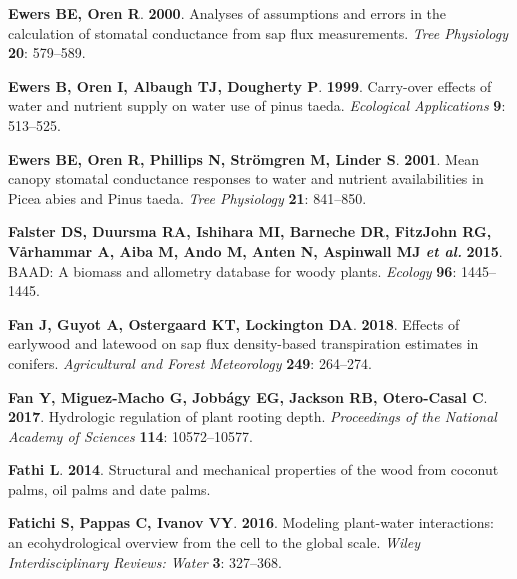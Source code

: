 \documentclass[11pt,twoside]{reedthesis}
\begin{document}
\hypertarget{ref-ewers_analyses_2000}{}
\textbf{\textnormal{Ewers BE}, \textnormal{Oren R}}. \textbf{2000}.
Analyses of assumptions and errors in the calculation of stomatal
conductance from sap flux measurements. \emph{Tree Physiology}
\textbf{20}: 579--589.

\hypertarget{ref-Ewers1999}{}
\textbf{\textnormal{Ewers B}, \textnormal{Oren I}, \textnormal{Albaugh
TJ}, \textnormal{Dougherty P}}. \textbf{1999}. Carry-over effects of
water and nutrient supply on water use of pinus taeda. \emph{Ecological
Applications} \textbf{9}: 513--525.

\hypertarget{ref-Ewers2001}{}
\textbf{\textnormal{Ewers BE}, \textnormal{Oren R}, \textnormal{Phillips
N}, \textnormal{Strömgren M}, \textnormal{Linder S}}. \textbf{2001}.
Mean canopy stomatal conductance responses to water and nutrient
availabilities in Picea abies and Pinus taeda. \emph{Tree Physiology}
\textbf{21}: 841--850.

\hypertarget{ref-Falster2015}{}
\textbf{\textnormal{Falster DS}, \textnormal{Duursma RA},
\textnormal{Ishihara MI}, \textnormal{Barneche DR}, \textnormal{FitzJohn
RG}, \textnormal{Vårhammar A}, \textnormal{Aiba M}, \textnormal{Ando M},
\textnormal{Anten N}, \textnormal{Aspinwall MJ} \emph{et al.}}
\textbf{2015}. BAAD: A biomass and allometry database for woody plants.
\emph{Ecology} \textbf{96}: 1445--1445.

\hypertarget{ref-Fan2018}{}
\textbf{\textnormal{Fan J}, \textnormal{Guyot A}, \textnormal{Ostergaard
KT}, \textnormal{Lockington DA}}. \textbf{2018}. Effects of earlywood
and latewood on sap flux density-based transpiration estimates in
conifers. \emph{Agricultural and Forest Meteorology} \textbf{249}:
264--274.

\hypertarget{ref-fan_hydrologic_2017}{}
\textbf{\textnormal{Fan Y}, \textnormal{Miguez-Macho G},
\textnormal{Jobbágy EG}, \textnormal{Jackson RB},
\textnormal{Otero-Casal C}}. \textbf{2017}. Hydrologic regulation of
plant rooting depth. \emph{Proceedings of the National Academy of
Sciences} \textbf{114}: 10572--10577.

\hypertarget{ref-Fathi2014}{}
\textbf{\textnormal{Fathi L}}. \textbf{2014}. Structural and mechanical
properties of the wood from coconut palms, oil palms and date palms.

\hypertarget{ref-Fatichi2016}{}
\textbf{\textnormal{Fatichi S}, \textnormal{Pappas C},
\textnormal{Ivanov VY}}. \textbf{2016}. Modeling plant-water
interactions: an ecohydrological overview from the cell to the global
scale. \emph{Wiley Interdisciplinary Reviews: Water} \textbf{3}:
327--368.
\end{document}
